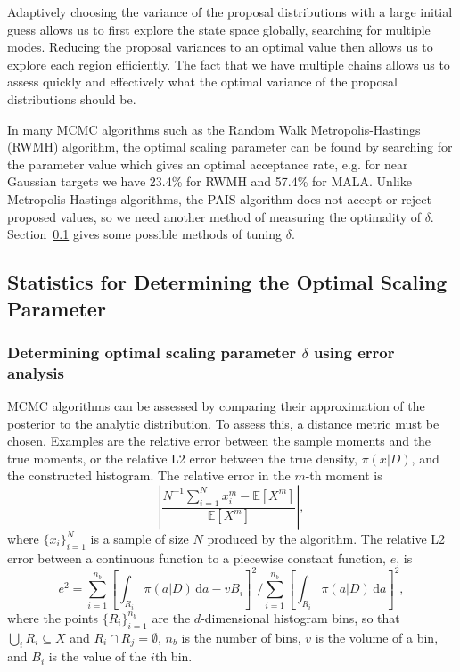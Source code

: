 \documentclass[final]{siamltex}
\begin{document}
Adaptively choosing the variance of the proposal distributions with a
large initial guess allows us to first explore the state space
globally, searching for multiple modes. Reducing the proposal variances to an
optimal value then allows us to explore each region efficiently. The
fact that we have multiple chains allows us to assess quickly and
effectively what the optimal variance of the proposal distributions
should be. 

In many MCMC algorithms such as the Random Walk Metropolis-Hastings (RWMH) algorithm, the optimal scaling parameter can be found by searching for the parameter value which gives an optimal acceptance rate, e.g. for near Gaussian targets we have 23.4\% for RWMH and 57.4\% for MALA\cite{roberts2001optimal}. Unlike Metropolis-Hastings algorithms, the PAIS algorithm does not accept or reject proposed values, so we need another method of measuring the optimality of $\delta$. Section~\ref{sec:statistics} gives some possible methods of tuning $\delta$.

\subsection{Statistics for Determining the Optimal Scaling Parameter}\label{sec:statistics}

\subsubsection{Determining optimal scaling parameter $\delta$ using error analysis}

MCMC algorithms can be assessed by comparing their approximation of the posterior to the analytic distribution. To assess this, a distance metric must be chosen. Examples are the relative error between the sample moments and the true moments, or the relative L2 error between the true density, $\pi(x|D)$, and the constructed histogram. The relative error in the $m$-th moment is
\[
	\left|\frac{N^{-1}\sum_{i=1}^N \! x_i^m - \mathbb{E}[X^m]}{\mathbb{E}[X^m]}\right|,
\]
where $\{x_i\}_{i=1}^N$ is a sample of size $N$ produced by the algorithm. The relative L2 error between a continuous function to a piecewise constant function, $e$, is
\begin{equation}\label{eqn:L2_error}
	e^2 = \sum\limits_{i=1}^{n_b}\left[\displaystyle\int_{R_i} \! \pi(a|D) \, \mbox{d}a - vB_i\right]^2 \Big/ \sum\limits_{i=1}^{n_b}\left[\displaystyle\int_{R_i} \! \pi(a|D) \, \mbox{d}a\right]^2,
\end{equation}
where the points $\{R_i\}_{i=1}^{n_b}$ are the $d$-dimensional histogram bins, so that $\bigcup_i R_i \subseteq X$ and $R_i\cap R_j=\emptyset$, $n_b$ is the number of bins, $v$ is the volume of a bin, and $B_i$ is the value of the $i$th bin. 
\end{document}
